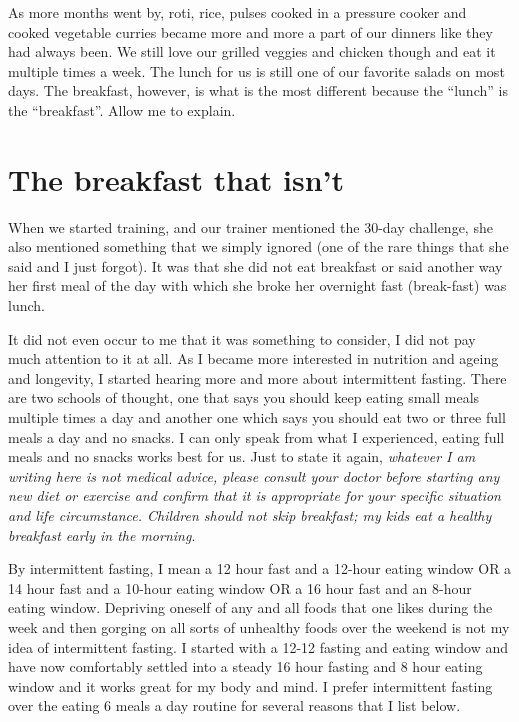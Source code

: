 \documentclass[
  oneside]{book}
\begin{document}
As more months went by, roti, rice, pulses cooked in a pressure cooker and cooked vegetable curries became more and more a part of our dinners like they had always been. We still love our grilled veggies and chicken though and eat it multiple times a week. The lunch for us is still one of our favorite salads on most days. The breakfast, however, is what is the most different because the ``lunch'' is the ``breakfast''. Allow me to explain.

\hypertarget{the-breakfast-that-isnt}{%
\section{The breakfast that isn't}\label{the-breakfast-that-isnt}}

When we started training, and our trainer mentioned the 30-day challenge, she also mentioned something that we simply ignored (one of the rare things that she said and I just forgot). It was that she did not eat breakfast or said another way her first meal of the day with which she broke her overnight fast (break-fast) was lunch.

It did not even occur to me that it was something to consider, I did not pay much attention to it at all. As I became more interested in nutrition and ageing and longevity, I started hearing more and more about intermittent fasting. There are two schools of thought, one that says you should keep eating small meals multiple times a day and another one which says you should eat two or three full meals a day and no snacks. I can only speak from what I experienced, eating full meals and no snacks works best for us. Just to state it again, \emph{whatever I am writing here is not medical advice, please consult your doctor before starting any new diet or exercise and confirm that it is appropriate for your specific situation and life circumstance. Children should not skip breakfast; my kids eat a healthy breakfast early in the morning}.

By intermittent fasting, I mean a 12 hour fast and a 12-hour eating window OR a 14 hour fast and a 10-hour eating window OR a 16 hour fast and an 8-hour eating window. Depriving oneself of any and all foods that one likes during the week and then gorging on all sorts of unhealthy foods over the weekend is not my idea of intermittent fasting. I started with a 12-12 fasting and eating window and have now comfortably settled into a steady 16 hour fasting and 8 hour eating window and it works great for my body and mind. I prefer intermittent fasting over the eating 6 meals a day routine for several reasons that I list below.
\end{document}
